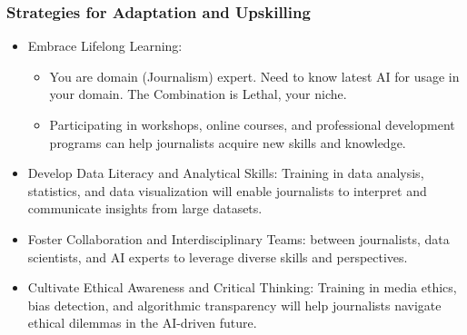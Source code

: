 \begin{frame}[fragile]\frametitle{Strategies for Adaptation and Upskilling}

\begin{itemize}
\item Embrace Lifelong Learning: 
    \begin{itemize}
        \item You are domain (Journalism) expert. Need to know latest AI for usage in your domain. The Combination is Lethal, your niche.
        \item Participating in workshops, online courses, and professional development programs can help journalists acquire new skills and knowledge.
    \end{itemize}
\item Develop Data Literacy and Analytical Skills: Training in data analysis, statistics, and data visualization will enable journalists to interpret and communicate insights from large datasets.
\item Foster Collaboration and Interdisciplinary Teams: between journalists, data scientists, and AI experts to leverage diverse skills and perspectives.
\item Cultivate Ethical Awareness and Critical Thinking: Training in media ethics, bias detection, and algorithmic transparency will help journalists navigate ethical dilemmas in the AI-driven future.
\end{itemize}

\end{frame}


